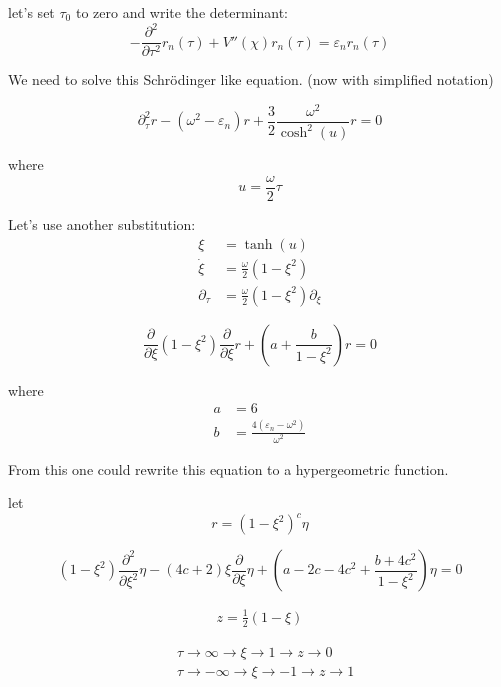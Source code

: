 \documentclass[12pt,a4paper]{article}
\numberwithin{equation}{section}
\begin{document}
let's set $\tau_0$ to zero and write the determinant:
\begin{equation}
-\frac{\partial^2}{\partial\tau^2} r_n (\tau) + V''(\chi) r_n (\tau) = \varepsilon_n r_n(\tau)
\end{equation}

We need to solve this Schrödinger like equation. (now with simplified notation)

\begin{equation}
\partial^2_\tau r - (\omega^2 - \varepsilon_n)r + \frac{3}{2} \frac{\omega^2}{\cosh^2 (u)} r = 0
\end{equation}

where 
\begin{equation}
u = \frac{\omega}{2}\tau
\end{equation}

Let's use another substitution:
\begin{align}
\xi &= \tanh(u) \\
\dot{\xi} &= \frac{\omega}{2} (1-\xi^2)\\
\partial_\tau &= \frac{\omega}{2}(1-\xi^2)\partial_\xi
\end{align}

\begin{equation}
\frac{\partial}{\partial \xi} (1-\xi^2) \frac{\partial}{\partial \xi} r + \left(a + \frac{b}{1-\xi^2}\right) r = 0
\end{equation}

where 
\begin{align}
a &= 6 \\
b &= \frac{4 (\varepsilon_n - \omega^2 )}{\omega^2}
\end{align}

From this one could rewrite this equation to a hypergeometric function.

let
\begin{equation}
r = (1-\xi^2)^c \eta
\end{equation}

\begin{equation}
(1-\xi^2) \frac{\partial^2}{\partial \xi^2} \eta - (4c + 2)\xi \frac{\partial}{\partial \xi} \eta + \left( a - 2c -4c^2 + \frac{b+4c^2}{1-\xi^2}  \right) \eta = 0
\end{equation}


\begin{align}
z = \frac{1}{2} (1-\xi)
\end{align}

\begin{align}
&\tau \rightarrow \infty \rightarrow \xi \rightarrow 1 \rightarrow z \rightarrow 0 \\
&\tau \rightarrow -\infty \rightarrow \xi \rightarrow -1 \rightarrow z \rightarrow 1
\end{align}
\end{document}
